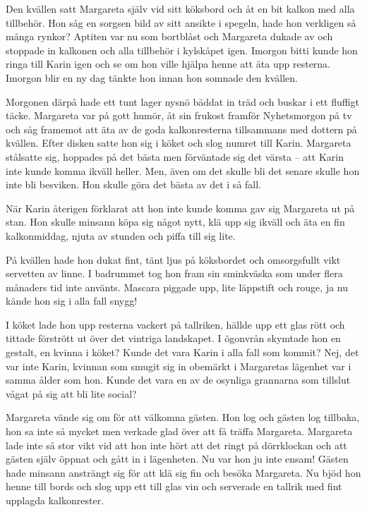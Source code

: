 Den kvällen satt Margareta själv vid sitt köksbord och åt en bit kalkon med alla tillbehör. Hon såg en sorgsen bild av sitt ansikte i spegeln, hade hon verkligen så många rynkor? Aptiten var nu som bortblåst och Margareta dukade av och stoppade in kalkonen och alla tillbehör i kylskåpet igen. Imorgon bitti kunde hon ringa till Karin igen och se om hon ville hjälpa henne att äta upp resterna. Imorgon blir en ny dag tänkte hon innan hon somnade den kvällen.

Morgonen därpå hade ett tunt lager nysnö bäddat in träd och buskar i ett fluffigt täcke. Margareta var på gott humör, åt sin frukost framför Nyhetsmorgon på tv och såg framemot att äta av de goda kalkonresterna tillsammans med dottern på kvällen. Efter disken satte hon sig i köket och slog numret till Karin. Margareta stålsatte sig, hoppades på det bästa men förväntade sig det värsta – att Karin inte kunde komma ikväll heller. Men, även om det skulle bli det senare skulle hon inte bli besviken. Hon skulle göra det bästa av det i så fall. 

När Karin återigen förklarat att hon inte kunde komma gav sig Margareta ut på stan. Hon skulle minsann köpa sig något nytt, klä upp sig ikväll och äta en fin kalkonmiddag, njuta av stunden och piffa till sig lite.

På kvällen hade hon dukat fint, tänt ljus på köksbordet och omsorgsfullt vikt servetten av linne. I badrummet tog hon fram sin sminkväska som under flera månaders tid inte använts. Mascara piggade upp, lite läppstift och rouge, ja nu kände hon sig i alla fall snygg!

I köket lade hon upp resterna vackert på tallriken, hällde upp ett glas rött och tittade förstrött ut över det vintriga landskapet. I ögonvrån skymtade hon en gestalt, en kvinna i köket?  Kunde det vara Karin i alla fall som kommit? Nej, det var inte Karin, kvinnan som smugit sig in obemärkt i Margaretas lägenhet var i samma ålder som hon. Kunde det vara en av de osynliga grannarna som tillslut vågat på sig att bli lite social? 

Margareta vände sig om för att välkomna gästen. Hon log och gästen log tillbaka, hon sa inte så mycket men verkade glad över att få träffa Margareta. Margareta lade inte så stor vikt vid att hon inte hört att det ringt på dörrklockan och att gästen själv öppnat och gått in i lägenheten. Nu var hon ju inte ensam! Gästen hade minsann ansträngt sig för att klä sig fin och besöka Margareta. Nu bjöd hon henne till bords och slog upp ett till glas vin och serverade en tallrik med fint upplagda kalkonrester. 

